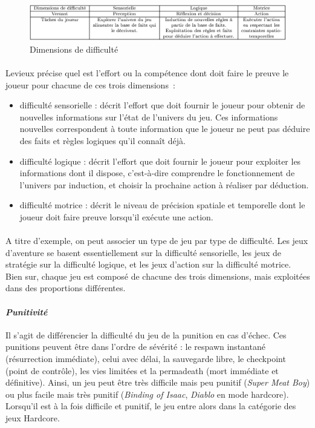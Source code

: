 \begin{figure}[!hbtp]
	\centering
	\includegraphics[width=\linewidth]{images/dimensions_difficulte.png}
	\caption{Dimensions de difficulté\cite{Levi11}}
	\label{dimensions_difficulte}
\end{figure}

\paragraph{}Levieux \cite{Levi11} précise quel est l'effort ou la compétence dont doit faire le preuve le joueur pour chacune de ces trois dimensions~:
	\begin{itemize}
		\item difficulté sensorielle : décrit l’effort que doit fournir le joueur pour obtenir de nouvelles informations sur l’état de l’univers du jeu. Ces informations nouvelles correspondent à toute information que le joueur ne peut pas déduire des faits et règles logiques qu’il connaît déjà.
		\item difficulté logique : décrit l’effort que doit fournir le joueur pour exploiter les informations dont il dispose, c’est-à-dire comprendre le fonctionnement de l’univers par induction, et choisir la prochaine action à réaliser par déduction.
		\item difficulté motrice : décrit le niveau de précision spatiale et temporelle dont le joueur doit faire preuve lorsqu’il exécute une action.
\end{itemize}
\paragraph{}
A titre d’exemple, on peut associer un type de jeu par type de difficulté. Les jeux d’aventure se basent essentiellement sur la difficulté sensorielle, les jeux de stratégie sur la difficulté logique, et les jeux d’action sur la difficulté motrice. Bien sur, chaque jeu est composé de chacune des trois dimensions, mais exploitées dans des proportions différentes.
		
		\paragraph{\emph{Punitivité}\\ \quad}
Il s’agit de différencier la difficulté du jeu de la punition en cas d’échec. Ces punitions peuvent être dans l’ordre de sévérité : le respawn instantané (résurrection immédiate), celui avec délai, la sauvegarde libre, le checkpoint (point de contrôle), les vies limitées et la permadeath (mort immédiate et définitive). Ainsi, un jeu peut être très difficile mais peu punitif (\emph{Super Meat Boy}) ou plus facile mais très punitif (\emph{Binding of Isaac}, \emph{Diablo} en mode hardcore). Lorsqu’il est à la fois difficile et punitif, le jeu entre alors dans la catégorie des jeux Hardcore.


